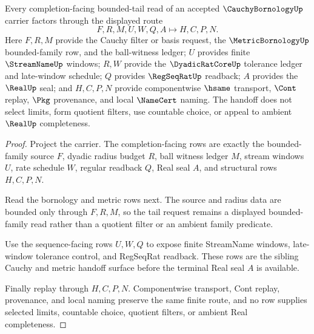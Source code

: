 \begin{theorem}
\label{thm:cauchy-bornology-bounded-tail-handoff}
Every completion-facing bounded-tail read of an accepted $\CauchyBornologyUp$ carrier factors through the displayed route
$$
F,R,M,U,W,Q,A \longmapsto H,C,P,N .
$$
Here $F,R,M$ provide the Cauchy filter or basis request, the $\MetricBornologyUp$ bounded-family row, and the ball-witness ledger; $U$ provides finite $\StreamNameUp$ windows; $R,W$ provide the $\DyadicRatCoreUp$ tolerance ledger and late-window schedule; $Q$ provides $\RegSeqRatUp$ readback; $A$ provides the $\RealUp$ seal; and $H,C,P,N$ provide componentwise $\hsame$ transport, $\Cont$ replay, $\Pkg$ provenance, and local $\NameCert$ naming. The handoff does not select limits, form quotient filters, use countable choice, or appeal to ambient $\RealUp$ completeness.
\end{theorem}
\begin{proof}
Project the carrier. The completion-facing rows are exactly the bounded-family source $F$, dyadic radius budget $R$, ball witness ledger $M$, stream windows $U$, rate schedule $W$, regular readback $Q$, Real seal $A$, and structural rows $H,C,P,N$.

Read the bornology and metric rows next. The source and radius data are bounded only through $F,R,M$, so the tail request remains a displayed bounded-family read rather than a quotient filter or an ambient family predicate.

Use the sequence-facing rows $U,W,Q$ to expose finite StreamName windows, late-window tolerance control, and RegSeqRat readback. These rows are the sibling Cauchy and metric handoff surface before the terminal Real seal $A$ is available.

Finally replay through $H,C,P,N$. Componentwise transport, Cont replay, provenance, and local naming preserve the same finite route, and no row supplies selected limits, countable choice, quotient filters, or ambient Real completeness.
\end{proof}


